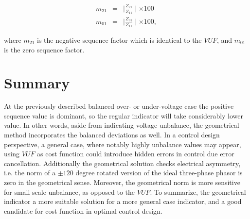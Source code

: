             \begin{equation}
                \begin{array}{rcl}
                       m_{21}&=&\mid\frac{Z_{21}}{Z_{11}}\mid\times100\\
                       m_{01}&=&\mid\frac{Z_{01}}{Z_{11}}\mid\times100,
                \end{array}
                \label{equ:factor}
            \end{equation}

where $m_{21}$ is the negative sequence factor which is identical to the $VUF$, and $m_{01}$ is the zero sequence factor.\\

\section{Summary}
At the previously described balanced over- or under-voltage case the positive sequence value is dominant, so the regular indicator will take considerably lower value. In other words, aside from indicating voltage unbalance, the geometrical method incorporates the balanced deviations as well. In a control design perspective, a general case, where notably highly unbalance values may appear, using $VUF$ as cost function could introduce hidden errors in control due error cancellation. Additionally the geometrical solution checks electrical asymmetry, i.e. the norm of a $\pm120$ degree rotated version of the ideal three-phase phasor is zero in the geometrical sense. Moreover, the geometrical norm is more sensitive for small scale unbalance, as opposed to the $VUF$. To summarize, the geometrical indicator a more suitable solution for a more general case indicator, and a good candidate for cost function in optimal control design. 